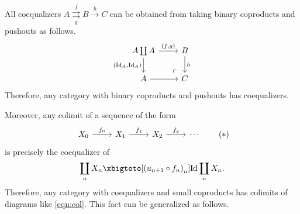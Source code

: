 \documentclass[10pt,letterpaper,cm]{nupset}
\theoremstyle{definition}
\theoremstyle{theorem}
\theoremstyle{remark}
\newcommand{\1}{\mathbf{1}}
\newcommand{\0}{\vec 0}
\DeclareMathOperator{\id}{Id}
\begin{document}
\smallskip

All coequalizers $A \overset{f}{\underset{g}{\rightrightarrows}} B \overset{h}{\longrightarrow} C$ can be obtained from taking binary coproducts and pushouts as follows.
\[
\begin{tikzcd}
A\coprod A \arrow[d, "{\left(\id_A, \id_A\right)}"']
 \arrow[dr, phantom, "\ulcorner", very near end]
 \arrow[r, "{\left(f,g\right)}"] & B \arrow[d, "h"] \\
A \arrow[r]                                                                      & C               
\end{tikzcd}
\] Therefore, any category with binary coproducts and pushouts has coequalizers.

   {\bigRelbar\bigRelbar{\bigtwoarrowsleft\rightarrow\rightarrow}}

Moreover, any colimit of a sequence of the form
\[ \label{eqn:col}
\begin{tikzcd}
X_0 \arrow[r, "f_0"] & X_1 \arrow[r, "f_1"] & X_2 \arrow[r, "f_2"] & \cdots
\end{tikzcd} \tag{$\ast$}
\] is precisely the coequalizer of
\[
\coprod_nX_n \xbigtoto[\left(u_{n+1}\circ f_n\right)_n]{\id} \coprod_nX_n.
\] Therefore, any category with coequalizers and small coproducts has colimits of diagrams like \eqref{eqn:col}. This fact can be generalized as follows.

\smallskip
\end{document}
